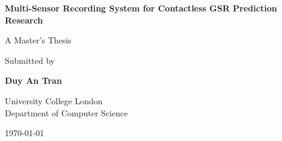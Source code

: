 \documentclass[11pt,a4paper]{report}
\begin{document}
\begin{titlepage}
\centering
\vspace*{2cm}

{\LARGE\textbf{Multi-Sensor Recording System for Contactless GSR Prediction Research}}

\vspace{1.5cm}

{\Large A Master's Thesis}

\vspace{1cm}

{\large Submitted by}

\vspace{0.5cm}

{\Large\textbf{Duy An Tran}}


\vspace{2cm}

{\large University College London\\
Department of Computer Science}

\vspace{1cm}

{\large \today}

\end{titlepage}

\tableofcontents
\newpage










\appendix


% 

% 



\end{document}
